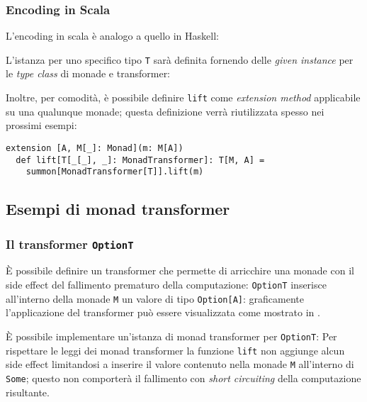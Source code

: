 \subsubsection{Encoding in Scala}
L'encoding in scala è analogo a quello in Haskell:

L'istanza per uno specifico tipo \lstinline{T} sarà definita fornendo delle \emph{given instance} per le \emph{type class} di monade e transformer:

Inoltre, per comodità, è possibile definire \lstinline{lift} come \emph{extension method} applicabile su una qualunque monade; questa definizione verrà riutilizzata spesso nei prossimi esempi:
\begin{lstlisting}[language=scala3]
extension [A, M[_]: Monad](m: M[A])
  def lift[T[_[_], _]: MonadTransformer]: T[M, A] =
    summon[MonadTransformer[T]].lift(m)
\end{lstlisting}

\subsection{Esempi di monad transformer}
\subsubsection{Il transformer \lstinline{OptionT}}
È possibile definire un transformer che permette di arricchire una monade con il side effect del fallimento prematuro della computazione:
\lstinline{OptionT} inserisce all'interno della monade \lstinline{M} un valore di tipo \lstinline{Option[A]}: graficamente l'applicazione del transformer può essere visualizzata come mostrato in .



È possibile implementare un'istanza di monad transformer per \lstinline{OptionT}:
Per rispettare le leggi dei monad transformer la funzione \lstinline{lift} non aggiunge alcun side effect limitandosi a inserire il valore contenuto nella monade \lstinline{M} all'interno di \lstinline{Some}; questo non comporterà il fallimento con \emph{short circuiting} della computazione risultante.

